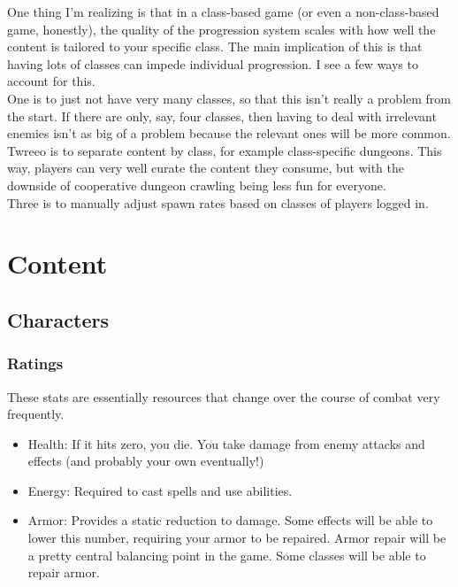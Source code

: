\documentclass{article}
\begin{document}
One thing I'm realizing is that in a class-based game (or even a non-class-based game, honestly), the
quality of the progression system scales with how well the content is tailored to your specific class.
The main implication of this is that having lots of classes can impede individual progression.
I see a few ways to account for this.\\
One is to just not have very many classes, so that this isn't
really a problem from the start. If there are only, say, four classes, then having to deal with
irrelevant enemies isn't as big of a problem because the relevant ones will be more common.\\
Twreeo is to separate content by class, for example class-specific dungeons. This way, players can
very well curate the content they consume, but with the downside of cooperative dungeon crawling
being less fun for everyone.\\
Three is to manually adjust spawn rates based on classes of players logged in.

\section{Content}
\subsection{Characters}
\subsubsection{Ratings}
These stats are essentially resources that change over the course of combat very frequently.
\begin{itemize}
    \item Health: If it hits zero, you die. You take damage from enemy attacks and effects (and probably
        your own eventually!)
    \item Energy: Required to cast spells and use abilities.
    \item Armor: Provides a static reduction to damage. Some effects will be able to lower this number,
        requiring your armor to be repaired. Armor repair
        will be a pretty central balancing point in the game. Some classes will be able to repair armor.
\end{itemize}
\end{document}
